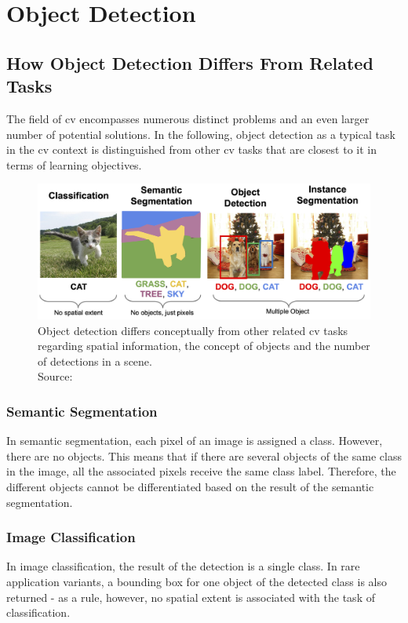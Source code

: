 \documentclass[
			   fontsize=11pt,
               paper=a4,
               bibliography=totoc,
               idxtotoc,
               headsepline,
               footsepline,
               footinclude=false,
               BCOR=12mm,
               DIV=13,
               openany,   %
               ]
               {scrbook}
\begin{document}
\chapter{Object Detection}

\section{How Object Detection Differs From Related Tasks} \label{sec:cvtasks}

The field of \gls{cv} encompasses numerous distinct problems and an even larger number of potential solutions. In the following, object detection as a typical task in the \gls{cv} context is distinguished from other \gls{cv} tasks that are closest to it in terms of learning objectives.

\begin{figure}[H] %
	\centering
	\includegraphics[width=\textwidth]{figures/detection_related_tasks.png}
	\caption[Typical Computer Vision Tasks]{Object detection differs conceptually from other related \gls{cv} tasks regarding spatial information, the concept of objects and the number of detections in a scene.\\
		\tiny{Source:~\cite{cvTasks}}}
	\label{fig:cvTasks} %
\end{figure}

\subsection{Semantic Segmentation}
In semantic segmentation, each pixel of an image is assigned a class. However, there are no objects. This means that if there are several objects of the same class in the image, all the associated pixels receive the same class label. Therefore, the different objects cannot be differentiated based on the result of the semantic segmentation.

\subsection{Image Classification}
In image classification, the result of the detection is a single class. In rare application variants, a bounding box for one object of the detected class is also returned - as a rule, however, no spatial extent is associated with the task of classification.
\end{document}
